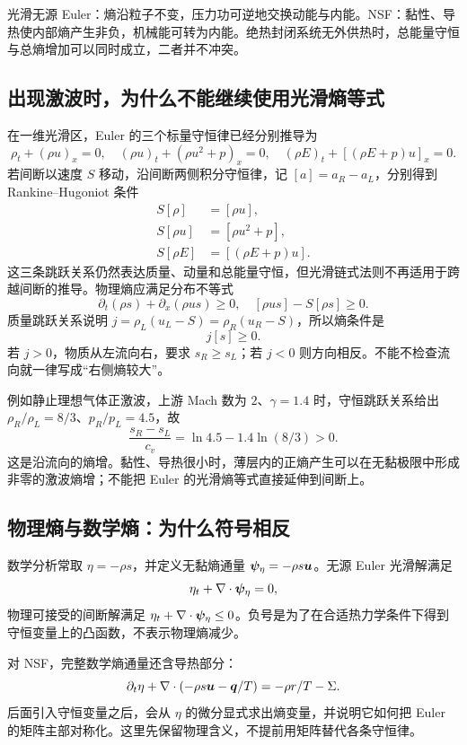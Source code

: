 \begin{keypoint}
光滑无源 Euler：熵沿粒子不变，压力功可逆地交换动能与内能。NSF：黏性、导热使内部熵产生非负，机械能可转为内能。绝热封闭系统无外供热时，总能量守恒与总熵增加可以同时成立，二者并不冲突。
\end{keypoint}

\subsection{出现激波时，为什么不能继续使用光滑熵等式}

在一维光滑区，Euler 的三个标量守恒律已经分别推导为
\begin{equation}
 \rho_t+(\rho u)_x=0,\quad
 (\rho u)_t+(\rho u^2+p)_x=0,\quad
 (\rho E)_t+[(\rho E+p)u]_x=0.
\end{equation}
若间断以速度 $S$ 移动，沿间断两侧积分守恒律，记 $[a]=a_R-a_L$，分别得到 Rankine--Hugoniot 条件
\begin{align}
 S[\rho]&=[\rho u],\\
 S[\rho u]&=[\rho u^2+p],\\
 S[\rho E]&=[(\rho E+p)u].
\end{align}
这三条跳跃关系仍然表达质量、动量和总能量守恒，但光滑链式法则不再适用于跨越间断的推导。物理熵应满足分布不等式
\begin{equation}
 \partial_t(\rho s)+\partial_x(\rho us)\ge0,
 \quad [\rho us]-S[\rho s]\ge0.
\end{equation}
质量跳跃关系说明 $j=\rho_L(u_L-S)=\rho_R(u_R-S)$，所以熵条件是
\begin{equation}
 \boxed{j[s]\ge0.}\label{eq:shock-entropy-mass-flux}
\end{equation}
若 $j>0$，物质从左流向右，要求 $s_R\ge s_L$；若 $j<0$ 则方向相反。不能不检查流向就一律写成“右侧熵较大”。

例如静止理想气体正激波，上游 Mach 数为 $2$、$\gamma=1.4$ 时，守恒跳跃关系给出 $\rho_R/\rho_L=8/3$、$p_R/p_L=4.5$，故
\begin{equation}
 \frac{s_R-s_L}{c_v}=\ln4.5-1.4\ln(8/3)>0.
\end{equation}
这是沿流向的熵增。黏性、导热很小时，薄层内的正熵产生可以在无黏极限中形成非零的激波熵增；不能把 Euler 的光滑熵等式直接延伸到间断上。

\subsection{物理熵与数学熵：为什么符号相反}

数学分析常取 $\eta=-\rho s$，并定义无黏熵通量 $\bm{\psi}_\eta=-\rho s\bm{u}$。无源 Euler 光滑解满足
\begin{equation}
 \eta_t+\nabla\cdot\bm{\psi}_\eta=0,
\end{equation}
物理可接受的间断解满足 $\eta_t+\nabla\cdot\bm{\psi}_\eta\le0$。负号是为了在合适热力学条件下得到守恒变量上的凸函数，不表示物理熵减少。

对 NSF，完整数学熵通量还含导热部分：
\begin{equation}
 \partial_t\eta+\nabla\cdot(-\rho s\bm{u}-\bm{q}/T)
 =-\rho r/T-\Sigma.
 \label{eq:math-entropy-nsf}
\end{equation}
后面引入守恒变量之后，会从 $\eta$ 的微分显式求出熵变量，并说明它如何把 Euler 的矩阵主部对称化。这里先保留物理含义，不提前用矩阵替代各条守恒律。

